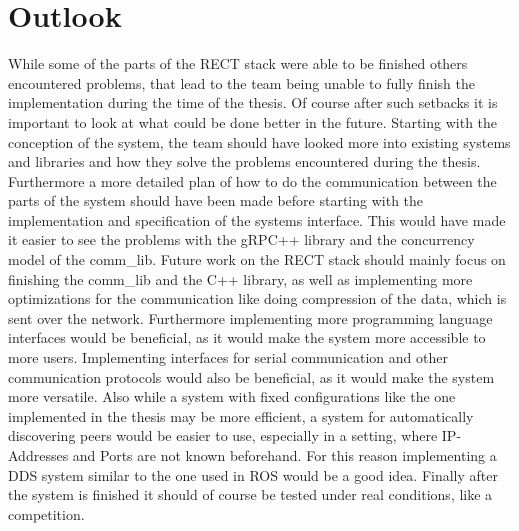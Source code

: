 \section{Outlook}
While some of the parts of the RECT stack were able to be finished others encountered problems, that lead to the team being unable to fully finish the implementation during the time of the thesis.
Of course after such setbacks it is important to look at what could be done better in the future. Starting with the conception of the system, the team should have looked more into existing
systems and libraries and how they solve the problems encountered during the thesis. Furthermore a more detailed plan of how to do the communication between the parts of the system should have been made
before starting with the implementation and specification of the systems interface. This would have made it easier to see the problems with the gRPC++ library and the concurrency model of the comm\_lib.
Future work on the RECT stack should mainly focus on finishing the comm\_lib and the C++ library, as well as implementing more optimizations for the communication like doing compression of the data, which is sent over the network.
Furthermore implementing more programming language interfaces would be beneficial, as it would make the system more accessible to more users. Implementing interfaces for serial communication and other communication protocols would
also be beneficial, as it would make the system more versatile. Also while a system with fixed configurations like the one implemented in the thesis may be more efficient, a system for automatically discovering peers would be easier
to use, especially in a setting, where IP-Addresses and Ports are not known beforehand. For this reason implementing a DDS system similar to the one used in ROS would be a good idea. Finally after the system is finished it should
of course be tested under real conditions, like a competition.

\filbreak